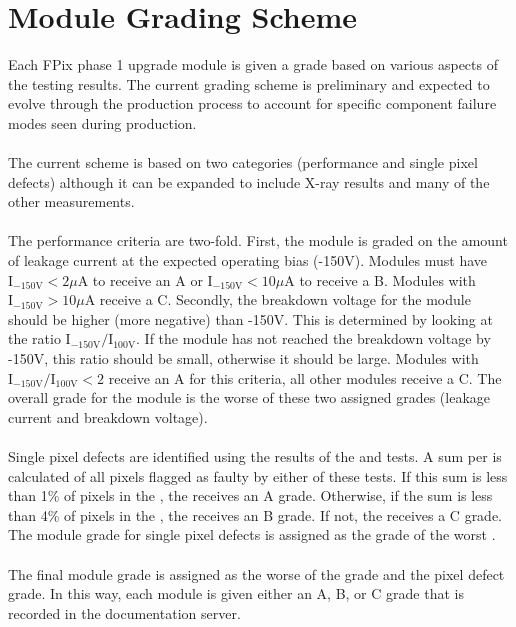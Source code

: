 \section{Module Grading Scheme}
\label{s:grading}



Each FPix phase 1 upgrade module is given a grade based on various aspects of the testing results.
The current grading scheme is preliminary and expected to evolve through the production process
to account for specific component failure modes seen during production.
\\\\
The current scheme is based on two categories (\iv performance and single pixel defects)
although it can be expanded to include X-ray results and many of the other \fulltest measurements.
\\\\
The \iv performance criteria are two-fold.  
First, the module is graded on the amount of leakage current at the expected operating bias (-150V).
Modules must have $\textrm{I}_{-150\textrm{V}} < 2 \mu \textrm{A}$ to receive an A
or $\textrm{I}_{-150\textrm{V}} < 10 \mu \textrm{A}$ to receive a B.
Modules with $\textrm{I}_{-150\textrm{V}} > 10 \mu \textrm{A}$ receive a C.
Secondly, the breakdown voltage for the module should be higher (more negative) than -150V.
This is determined by looking at the ratio $\textrm{I}_{-150\textrm{V}}/\textrm{I}_{100\textrm{V}}$.
If the module has not reached the breakdown voltage by -150V, this ratio should be small, 
otherwise it should be large.
Modules with $\textrm{I}_{-150\textrm{V}}/\textrm{I}_{100\textrm{V}} < 2$ receive an A for this criteria,
all other modules receive a C.
The overall \iv grade for the module is the worse of these two assigned grades (leakage current and breakdown voltage).
\\\\
Single pixel defects are identified using the results of the \alivetest and \bb tests.
A sum per \roc is calculated of all pixels flagged as faulty by either of these tests.
If this sum is less than 1\% of pixels in the \roc, the \roc receives an A grade.
Otherwise, if the sum is less than 4\% of pixels in the \roc, the \roc receives an B grade.
If not, the \roc receives a C grade.
The module grade for single pixel defects is assigned as the grade of the worst \roc.
\\\\
The final module grade is assigned as the worse of the \iv grade and the pixel defect grade.
In this way, each module is given either an A, B, or C grade that is recorded in the documentation server.

